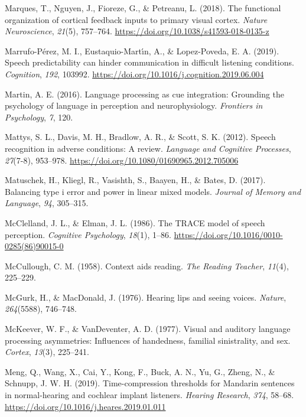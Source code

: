 \documentclass[a4paper, nobind]{templates/ociamthesis}
\newlength{\cslhangindent}
\newenvironment{CSLReferences}[2] %
 {%
  \setlength{\parindent}{0pt}
  \ifodd #1
  \let\oldpar\par
  \def\par{\hangindent=\cslhangindent\oldpar}
  \fi
  \setlength{\parskip}{1mm}
  \setlength{\baselineskip}{6mm}
 }%
 {}
\begin{document}
\begin{CSLReferences}{1}{0}
\leavevmode{}%
Marques, T., Nguyen, J., Fioreze, G., \& Petreanu, L. (2018). The functional organization of cortical feedback inputs to primary visual cortex. \emph{Nature Neuroscience}, \emph{21}(5), 757--764. \url{https://doi.org/10.1038/s41593-018-0135-z}

\leavevmode{}%
Marrufo-Pérez, M. I., Eustaquio-Martı́n, A., \& Lopez-Poveda, E. A. (2019). Speech predictability can hinder communication in difficult listening conditions. \emph{Cognition}, \emph{192}, 103992. \url{https://doi.org/10.1016/j.cognition.2019.06.004}

\leavevmode{}%
Martin, A. E. (2016). Language processing as cue integration: Grounding the psychology of language in perception and neurophysiology. \emph{Frontiers in Psychology}, \emph{7}, 120.

\leavevmode{}%
Mattys, S. L., Davis, M. H., Bradlow, A. R., \& Scott, S. K. (2012). {Speech recognition in adverse conditions: A review}. \emph{Language and Cognitive Processes}, \emph{27}(7-8), 953--978. \url{https://doi.org/10.1080/01690965.2012.705006}

\leavevmode{}%
Matuschek, H., Kliegl, R., Vasishth, S., Baayen, H., \& Bates, D. (2017). Balancing type i error and power in linear mixed models. \emph{Journal of Memory and Language}, \emph{94}, 305--315.

\leavevmode{}%
McClelland, J. L., \& Elman, J. L. (1986). {The TRACE model of speech perception}. \emph{Cognitive Psychology}, \emph{18}(1), 1--86. \url{https://doi.org/10.1016/0010-0285(86)90015-0}

\leavevmode{}%
McCullough, C. M. (1958). {Context aids reading}. \emph{The Reading Teacher}, \emph{11}(4), 225--229.

\leavevmode{}%
McGurk, H., \& MacDonald, J. (1976). Hearing lips and seeing voices. \emph{Nature}, \emph{264}(5588), 746--748.

\leavevmode{}%
McKeever, W. F., \& VanDeventer, A. D. (1977). Visual and auditory language processing asymmetries: Influences of handedness, familial sinistrality, and sex. \emph{Cortex}, \emph{13}(3), 225--241.

\leavevmode{}%
Meng, Q., Wang, X., Cai, Y., Kong, F., Buck, A. N., Yu, G., Zheng, N., \& Schnupp, J. W. H. (2019). {Time-compression thresholds for Mandarin sentences in normal-hearing and cochlear implant listeners}. \emph{Hearing Research}, \emph{374}, 58--68. \url{https://doi.org/10.1016/j.heares.2019.01.011}


\end{CSLReferences}
\end{document}
